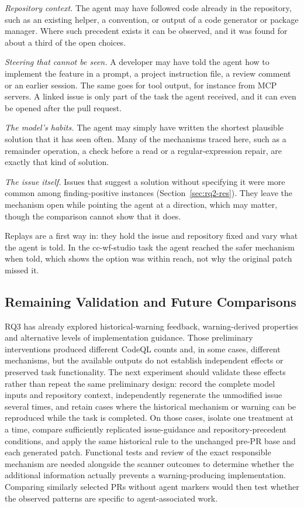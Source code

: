 \documentclass[acmsmall,screen,nonacm]{acmart}
\begin{document}
\emph{Repository context.} The agent may have followed code already in the repository, such as an existing helper, a convention, or output of a code generator or package manager. Where such precedent exists it can be observed, and it was found for about a third of the open choices.

\emph{Steering that cannot be seen.} A developer may have told the agent how to implement the feature in a prompt, a project instruction file, a review comment or an earlier session. The same goes for tool output, for instance from MCP servers. A linked issue is only part of the task the agent received, and it can even be opened after the pull request.

\emph{The model's habits.} The agent may simply have written the shortest plausible solution that it has seen often. Many of the mechanisms traced here, such as a remainder operation, a check before a read or a regular-expression repair, are exactly that kind of solution.

\emph{The issue itself.} Issues that suggest a solution without specifying it were more common among finding-positive instances (Section~\ref{sec:rq2-res}). They leave the mechanism open while pointing the agent at a direction, which may matter, though the comparison cannot show that it does.

Replays are a first way in: they hold the issue and repository fixed and vary what the agent is told. In the cc-wf-studio task the agent reached the safer mechanism when told, which shows the option was within reach, not why the original patch missed it.


\subsection{Remaining Validation and Future Comparisons}

RQ3 has already explored historical-warning feedback, warning-derived properties and alternative levels of implementation guidance. Those preliminary interventions produced different CodeQL counts and, in some cases, different mechanisms, but the available outputs do not establish independent effects or preserved task functionality. The next experiment should validate these effects rather than repeat the same preliminary design: record the complete model inputs and repository context, independently regenerate the unmodified issue several times, and retain cases where the historical mechanism or warning can be reproduced while the task is completed. On those cases, isolate one treatment at a time, compare sufficiently replicated issue-guidance and repository-precedent conditions, and apply the same historical rule to the unchanged pre-PR base and each generated patch. Functional tests and review of the exact responsible mechanism are needed alongside the scanner outcomes to determine whether the additional information actually prevents a warning-producing implementation. Comparing similarly selected PRs without agent markers would then test whether the observed patterns are specific to agent-associated work.
\end{document}
